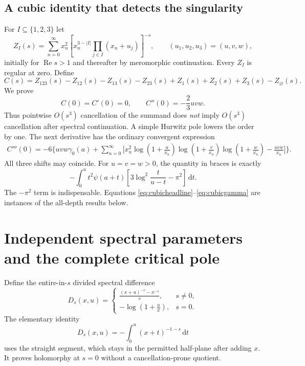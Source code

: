 \documentclass[11pt]{article}
\numberwithin{equation}{section}
\theoremstyle{definition}\newtheorem{definition}[theorem]{Definition}
\theoremstyle{remark}\newtheorem{remark}[theorem]{Remark}
\newcommand{\dd}{\,\mathrm d}
\newcommand{\Rea}{\operatorname{Re}}
\begin{document}
\subsection{A cubic identity that detects the singularity}
For $I\subseteq\{1,2,3\}$ let
\begin{equation}\label{eq:ZIexample}
 Z_I(s)=\sum_{n=0}^{\infty}x_n^2
 \left[x_n^{3-|I|}\prod_{j\in I}(x_n+u_j)\right]^{-s},
 \qquad (u_1,u_2,u_3)=(u,v,w),
\end{equation}
initially for $\Rea s>1$ and thereafter by meromorphic continuation. Every $Z_I$ is regular at zero. Define
\[
 C(s)=Z_{123}(s)-Z_{12}(s)-Z_{13}(s)-Z_{23}(s)
       +Z_1(s)+Z_2(s)+Z_3(s)-Z_{\varnothing}(s).
\]
We prove
\begin{equation}\label{eq:cubicheadline}
 C(0)=C'(0)=0,\qquad C''(0)=-\frac23uvw.
\end{equation}
Thus pointwise $O(s^3)$ cancellation of the summand does \emph{not} imply $O(s^3)$ cancellation after spectral continuation. A simple Hurwitz pole lowers the order by one. The next derivative has the ordinary convergent expression
\begin{align}\label{eq:cubicthird}
 C'''(0)=-6\biggl\{uvw\gamma_0(a)+\sum_{n=0}^{\infty}
 \biggl[x_n^2\log\left(1+\frac u{x_n}\right)
 \log\left(1+\frac v{x_n}\right)\log\left(1+\frac w{x_n}\right)
 -\frac{uvw}{x_n}\biggr]\biggr\}.
\end{align}
All three shifts may coincide. For $u=v=w>0$, the quantity in braces is exactly
\begin{equation}\label{eq:cubicgamma}
 -\int_0^u t^2\psi(a+t)
 \left[3\log^2\frac{t}{u-t}-\pi^2\right]\dd t.
\end{equation}
The $-\pi^2$ term is indispensable. Equations \eqref{eq:cubicheadline}--\eqref{eq:cubicgamma} are instances of the all-depth results below.

\section{Independent spectral parameters and the complete critical pole}
Define the entire-in-$s$ divided spectral difference
\begin{equation}\label{eq:Ddef}
 D_s(x,u)=
 \begin{cases}
 \displaystyle\frac{(x+u)^{-s}-x^{-s}}s,&s\ne0,\\[5pt]
 \displaystyle-\log\left(1+\frac ux\right),&s=0.
 \end{cases}
\end{equation}
The elementary identity
\begin{equation}\label{eq:Dprimitive}
 D_s(x,u)=-\int_0^u(x+t)^{-1-s}\dd t
\end{equation}
uses the straight segment, which stays in the permitted half-plane after adding $x$. It proves holomorphy at $s=0$ without a cancellation-prone quotient.
\end{document}
